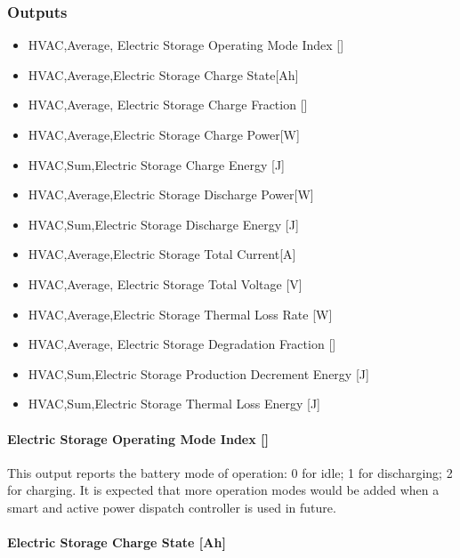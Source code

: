 \subsubsection{Outputs}\label{electricloadcenter-storagebattery-outputs}

\begin{itemize}
\item
  HVAC,Average, Electric Storage Operating Mode Index {[]}
\item
  HVAC,Average,Electric Storage Charge State{[}Ah{]}
\item
  HVAC,Average, Electric Storage Charge Fraction {[]}
\item
  HVAC,Average,Electric Storage Charge Power{[}W{]}
\item
  HVAC,Sum,Electric Storage Charge Energy {[}J{]}
\item
  HVAC,Average,Electric Storage Discharge Power{[}W{]}
\item
  HVAC,Sum,Electric Storage Discharge Energy {[}J{]}
\item
  HVAC,Average,Electric Storage Total Current{[}A{]}
\item
  HVAC,Average, Electric Storage Total Voltage {[}V{]}
\item
  HVAC,Average,Electric Storage Thermal Loss Rate {[}W{]}
\item
  HVAC,Average, Electric Storage Degradation Fraction {[]}
\item
  HVAC,Sum,Electric Storage Production Decrement Energy {[}J{]}
\item
  HVAC,Sum,Electric Storage Thermal Loss Energy {[}J{]}
\end{itemize}

\paragraph{Electric Storage Operating Mode Index {[]}}\label{electric-storage-operating-mode-index}

This output reports the battery mode of operation: 0 for idle; 1 for discharging; 2 for charging. It is expected that more operation modes would be added when a smart and active power dispatch controller is used in future.

\paragraph{Electric Storage Charge State {[}Ah{]}}\label{electric-storage-charge-state-ah}

